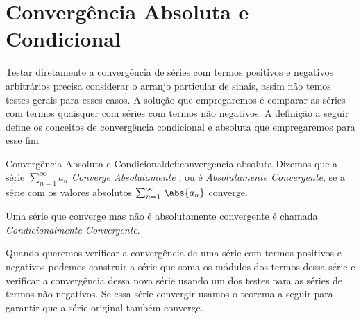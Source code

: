 \section{Convergência Absoluta e Condicional}

Testar diretamente a convergência de séries com termos positivos e
negativos arbitrários precisa considerar o arranjo particular de sinais,
assim não temos testes gerais para esses casos.
A solução que empregaremos é comparar as séries com termos quaisquer
com séries com termos não negativos.
A definição a seguir define os conceitos de convergência condicional e absoluta
que empregaremos para esse fim.

\begin{definicao}{Convergência Absoluta e Condicional}{def:convergencia-absoluta}
  Dizemos que a série
  \(
    \sum_{n=1}^\infty a_n
  \)
  \emph{Converge Absolutamente}%
  ,
  ou é \emph{Absolutamente Convergente}, se a série
  com os valores absolutos
  \(
    \sum_{n=1}^\infty \,\abs{a_n}
  \)
  converge.

  Uma série que converge mas não é absolutamente convergente
  é chamada \emph{Condicionalmente Convergente}.
\end{definicao}

Quando queremos verificar a convergência de uma série com termos positivos
e negativos podemos construir a série que soma os módulos dos termos dessa
série e verificar a convergência dessa nova série usando um dos testes
para as séries de termos não negativos.
Se essa série convergir usamos o teorema a seguir para garantir
que a série original também converge.

